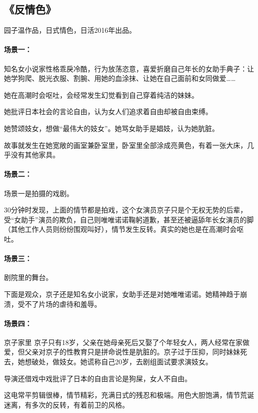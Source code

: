 \subsection{《反情色》}
园子温作品，日式情色，日活2016年出品。

\paragraph{场景一：}知名女小说家性格乖戾冷酷，行为放荡恣意，喜爱折磨自己年长的女助手典子：让她学狗爬、脱光衣服、割腕、用她的血涂抹、让她在自己面前和女同做爱……

她在高潮时会呕吐，会经常发生幻觉看到自己穿着纯洁的妹妹。

她批评日本社会的言论自由，认为女人们追求着自由却被自由束缚。

她赞颂妓女，想做“最伟大的妓女”。她骂女助手是娼妓，认为她肮脏。

故事就发生在她宽敞的画室兼卧室里，卧室里全部涂成亮黄色，有着一张大床，几乎没有其他家具。

\paragraph{场景二：}场景一是拍摄的戏剧。

30分钟时发现，上面的情节都是拍戏，这个女演员京子只是个无权无势的后辈，受“女助手”演员的欺负，自己则唯唯诺诺鞠躬道歉，甚至还被逼舔年长女演员的脚（其他工作人员则纷纷围观叫好），情节发生反转。真实的她也是在高潮时会呕吐。

\paragraph{场景三：}剧院里的舞台。

下面是观众，京子还是知名女小说家，女助手还是对她唯唯诺诺。她精神趋于崩溃，受不了片场的虐待和羞辱。

\paragraph{场景四：}京子家里
京子只有18岁，父亲在她母亲死后又娶了个年轻女人，两人经常在家做爱，但父亲对京子的性教育只是拼命说性是肮脏的。京子过于压抑，同时妹妹死去，她想破处，做妓女。她谎称自己20岁，去剧组面试要求演妓女。

导演还借戏中戏批评了日本的自由言论是狗屎，女人不自由。

这电常平剪辑很棒，情节精彩，充满日式的残忍和极端。用色大胆饱满，情节荒诞迷离，有多次的反转，有着前卫的风格。